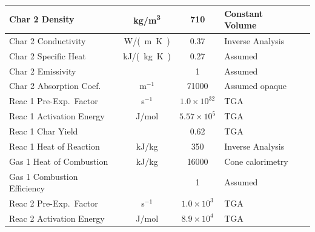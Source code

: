 \begin{table}[p]
\begin{center}
\begin{tabular}{|l|c|c|l|l|}
Char 2 Density              & \unit{kg/m^3}      & 710                               & Constant Volume           &  \cite{Oztekin:CF2012}                  \\ \hline
Char 2 Conductivity         & \unit{W/(m.K)}& 0.37                              & Inverse Analysis          &  \cite{Oztekin:CF2012}                  \\ \hline
Char 2 Specific Heat        & \unit{kJ/(kg.K)}       & 0.27                              & Assumed                   &  \cite{Oztekin:CF2012}                  \\ \hline
Char 2 Emissivity           &               & 1                                 & Assumed                   &  \cite{Oztekin:CF2012}                  \\ \hline
Char 2 Absorption Coef.     & m$^{-1}$      & 71000                             & Assumed opaque            &  \cite{Oztekin:CF2012}                  \\ \hline
Reac 1 Pre-Exp.~Factor      & s$^{-1}$      & $1.0 \times 10^{32}$              & TGA                       &  \cite{Oztekin:CF2012}                  \\ \hline
Reac 1 Activation Energy    & J/mol       & $5.57 \times 10^5$                & TGA                       &  \cite{Oztekin:CF2012}                  \\ \hline
Reac 1 Char Yield           &               & 0.62                              & TGA                       &  \cite{Oztekin:CF2012}                  \\ \hline
Reac 1 Heat of Reaction     & kJ/kg         & 350                               & Inverse Analysis          &  \cite{Oztekin:CF2012}                  \\ \hline
Gas 1 Heat of Combustion    & kJ/kg         & 16000                             & Cone calorimetry          &  \cite{Oztekin:CF2012}                  \\ \hline
Gas 1 Combustion Efficiency &               & 1                                 & Assumed                   &  \cite{Oztekin:CF2012}                  \\ \hline
Reac 2 Pre-Exp.~Factor      & s$^{-1}$      & $1.0 \times 10^3$                 & TGA                       &  \cite{Oztekin:CF2012}                  \\ \hline
Reac 2 Activation Energy    & J/mol       & $8.9 \times 10^4$                 & TGA                       &  \cite{Oztekin:CF2012}                  \\ \hline

\end{tabular}
\end{center}
\end{table}
